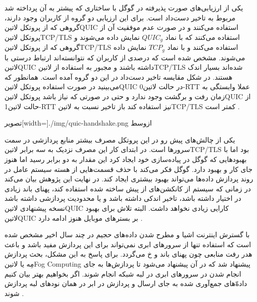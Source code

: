 یکی از ارزیابی‌های صورت پذیرفته در گوگل با ساختاری که پیشتر به آن پرداخته شد مربوط به تاخیر دست‌داد است. برای این ارزیابی دو گروه از کاربران وجود دارند، گروهی که از پروتکل ‌لاتین{QUIC} استفاده می‌کنند
و در صورت عدم موفقیت آن از پروتکل ‌لاتین{TCP/TLS} استفاده می‌کنند که با نماد $QUIC_{g}$ نمایش داده می‌شوند و گروهی که از پروتکل ‌لاتین{TCP/TLS} استفاده می‌کنند و با نماد $TCP_{g}$
نمایش داده می‌شوند. مشخص شده است که درصدی از کاربران که نتوانسته‌اند ارتباط درستی با ‌لاتین{QUIC} داشته باشند و مجبور به استفاده از ‌لاتین{TCP/TLS} شده‌اند بسیار اندک هستند.
در شکل  مقایسه تاخیر دست‌داد در این دو گروه آمده است. همانطور که می‌بینید در صورت استفاده پروتکل ‌لاتین{QUIC} در حالت ‌لاتین{0-RTT}
عملا وابستگی به زمان رفت و برگشت وجود ندارد و حتی در صورتی که نیاز باشد پروتکل ‌لاتین{QUIC} از حالت ‌لاتین{1-RTT} نیز استفاده کند باز تاخیر نسبت به ‌لاتین{TCP/TLS} کمتر است
.

‌تصویر[width=\textwidth]{./img/quic-handshake.png}
‌ازوسط

یکی از چالش‌های پیش رو در این پروتکل مصرف بیشتر منابع پردازشی در سمت سرورها است. در ابتدای کار این مصرف نزدیک به سه برابر ‌لاتین{TCP/TLS} بود اما با بهبودهایی که گوگل در پیاده‌سازی خود ایجاد کرد
این مقدار به دو برابر رسید اما هنوز جای کار و بهبود دارد. گوگل فکر می‌کند با حذف قسمت‌هایی از هسته سیستم عامل در روند پردازش داده‌ها می‌تواند بهبود بیشتری ایجاد کند.
در نهایت این پژوهش بیان می‌کند در زمانی که سیستم از کانکشن‌های از پیش ساخته شده استفاده کند، پهنای باند زیادی در اختیار داشته باشد، تاخیر اندکی داشته باشد و یا محدودیت پردازشی داشته باشد نسخه پیشنهادی
‌لاتین{QUIC} کارایی زیادی نخواهد داشت. البته تلاش برای بهبود ‌لاتین{QUIC} بر بسترهای موبایل هنوز ادامه دارد
.


با گسترش اینترنت اشیا و مطرح شدن داده‌های حجیم در چند سال اخیر مشخص شده است که استفاده تنها از سرورهای ابری نمی‌تواند برای این پردازش مفید باشد و باعث هدر رفت منابعی چون پهنای باند و ‌خ می‌گردد.
برای پاسخ به این مشکل، بحث پردازش مِه یا ‌لاتین{Fog Computing} پیشنهاد شد که در آن پیشنهاد می‌شود تا پردازش‌ها به جای انجام شدن در سرورهای ابری در لبه شبکه انجام شوند.
اگر بخواهیم بهتر بیان کنیم داده‌ّهای جمع‌آوری شده به جای ارسال و پردازش در ابر در همان نودهای لبه پردازش شوند
.

